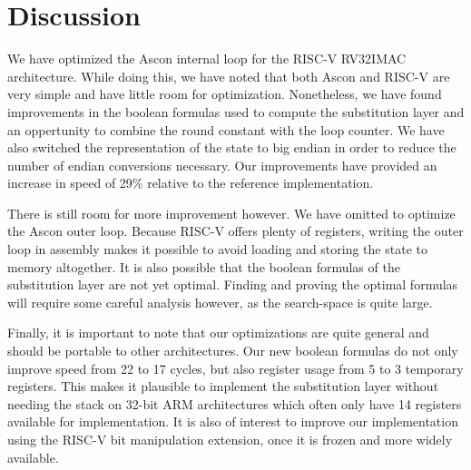 \section{Discussion}

We have optimized the Ascon internal loop for the RISC-V RV32IMAC architecture.
While doing this, we have noted that both Ascon and RISC-V are very simple and
have little room for optimization. Nonetheless, we have found improvements in
the boolean formulas used to compute the substitution layer and an oppertunity
to combine the round constant with the loop counter. We have also switched the
representation of the state to big endian in order to reduce the number of
endian conversions necessary. Our improvements have provided an increase in
speed of 29\% relative to the reference implementation.

There is still room for more improvement however. We have omitted to optimize
the Ascon outer loop. Because RISC-V offers plenty of registers, writing the
outer loop in assembly makes it possible to avoid loading and storing the state
to memory altogether. It is also possible that the boolean formulas of the
substitution layer are not yet optimal. Finding and proving the optimal formulas
will require some careful analysis however, as the search-space is quite large.

Finally, it is important to note that our optimizations are quite general and
should be portable to other architectures. Our new boolean formulas do not only
improve speed from 22 to 17 cycles, but also register usage from 5 to 3
temporary registers. This makes it plausible to implement the substitution layer
without needing the stack on 32-bit ARM architectures which often only have 14
registers available for implementation. It is also of interest to improve our
implementation using the RISC-V bit manipulation extension, once it is frozen
and more widely available.
